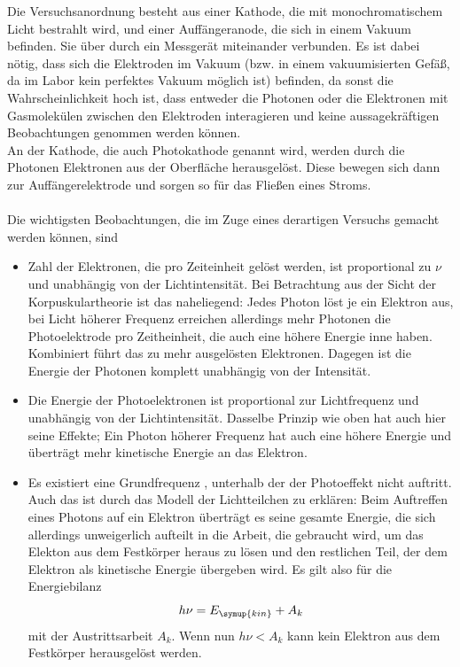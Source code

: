     \noindent Die Versuchsanordnung besteht aus einer Kathode, die mit monochromatischem Licht bestrahlt wird, und einer Auffängeranode, 
    die sich in einem Vakuum befinden. Sie über durch ein Messgerät miteinander verbunden. Es ist dabei nötig, dass sich die Elektroden 
    im Vakuum (bzw. in einem vakuumisierten Gefäß, da im Labor kein perfektes Vakuum möglich ist) befinden, da sonst die Wahrscheinlichkeit hoch ist, dass
    entweder die Photonen oder die Elektronen mit Gasmolekülen zwischen den Elektroden interagieren und keine aussagekräftigen Beobachtungen 
    genommen werden können.\\
    An der Kathode, die auch Photokathode genannt wird, werden durch die Photonen Elektronen aus der Oberfläche herausgelöst. Diese bewegen sich
    dann zur Auffängerelektrode und sorgen so für das Fließen eines Stroms.\\
    \\
    Die wichtigsten Beobachtungen, die im Zuge eines derartigen Versuchs gemacht werden können, sind
    \begin{itemize}
        \item Zahl der Elektronen, die pro Zeiteinheit gelöst werden, ist proportional zu $\nu$ und unabhängig von der Lichtintensität. Bei Betrachtung aus der Sicht
        der Korpuskulartheorie ist das naheliegend: Jedes Photon löst je ein Elektron aus, bei Licht höherer Frequenz erreichen allerdings mehr Photonen 
        die Photoelektrode pro Zeitheinheit, die auch eine höhere Energie inne haben. Kombiniert führt das zu mehr ausgelösten Elektronen. Dagegen ist die Energie 
        der Photonen komplett unabhängig von der Intensität.
        \item  Die Energie der Photoelektronen ist proportional zur Lichtfrequenz und unabhängig von der Lichtintensität. Dasselbe Prinzip wie oben hat auch hier seine Effekte;
        Ein Photon höherer Frequenz hat auch eine höhere Energie und überträgt mehr kinetische Energie an das Elektron.
        \item Es existiert eine Grundfrequenz , unterhalb der der Photoeffekt nicht auftritt. Auch das ist durch das Modell der Lichtteilchen zu erklären: Beim Auftreffen
        eines Photons auf ein Elektron überträgt es seine gesamte Energie, die sich allerdings unweigerlich aufteilt in die Arbeit, die gebraucht wird, um das Elekton 
        aus dem Festkörper heraus zu lösen und den restlichen Teil, der dem Elektron als kinetische Energie übergeben wird. Es gilt also für die Energiebilanz
        \begin{equation}
            h \nu = E_{\symup{kin}} + A_k 
            \label{eqn:bilanz}
        \end{equation}
        mit der Austrittsarbeit $A_k$. Wenn nun $h \nu < A_k$ kann kein Elektron aus dem Festkörper herausgelöst werden.
    \end{itemize}

